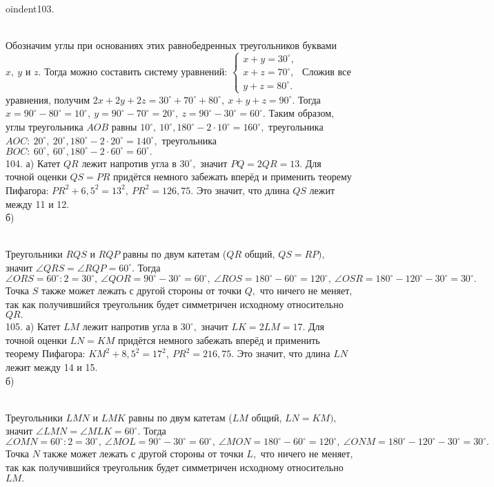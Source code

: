 oindent103.\begin{figure}[ht!]
\end{figure}\\
Обозначим углы при основаниях этих равнобедренных треугольников буквами $x,\ y$ и $z.$ Тогда можно составить систему уравнений: $\begin{cases}x+y=30^\circ,\\
x+z=70^\circ,\\ y+z=80^\circ.\end{cases}$ Сложив все уравнения, получим $2x+2y+2z=30^\circ+70^\circ+80^\circ,\ x+y+z=90^\circ.$ Тогда $x=90^\circ-80^\circ=10^\circ,\ y=90^\circ-70^\circ=20^\circ,\ z=90^\circ-30^\circ=60^\circ.$ Таким образом, углы треугольника $AOB$ равны $10^\circ,\ 10^\circ, 180^\circ-2\cdot10^\circ=160^\circ,$ треугольника $AOC:\ 20^\circ,\ 20^\circ, 180^\circ-2\cdot20^\circ=140^\circ,$ треугольника $BOC:\ 60^\circ,\ 60^\circ, 180^\circ-2\cdot60^\circ=60^\circ.$\\
104. а) Катет $QR$ лежит напротив угла в $30^\circ,$ значит $PQ=2QR=13.$ Для точной оценки $QS=PR$ придётся немного забежать вперёд и применить теорему Пифагора: $PR^2+6,5^2=13^2,\ PR^2=126,75.$ Это значит, что длина $QS$ лежит между 11 и 12.\\
б)\begin{figure}[ht!]
\end{figure}\\
Треугольники $RQS$ и $RQP$ равны по двум катетам ($QR$ общий, $QS=RP),$ значит $\angle QRS=\angle RQP=60^\circ.$ Тогда $\angle ORS=60^\circ:2=30^\circ,\ \angle QOR=90^\circ-30^\circ=60^\circ,\ \angle ROS=180^\circ-60^\circ=120^\circ,\ \angle OSR=180^\circ-120^\circ-30^\circ=30^\circ.$ Точка $S$ также может лежать с другой стороны от точки $Q,$ что ничего не меняет, так как получившийся треугольник будет симметричен исходному относительно $QR.$\\
105. а) Катет $LM$ лежит напротив угла в $30^\circ,$ значит $LK=2LM=17.$ Для точной оценки $LN=KM$ придётся немного забежать вперёд и применить теорему Пифагора: $KM^2+8,5^2=17^2,\ PR^2=216,75.$ Это значит, что длина $LN$ лежит между 14 и 15.\\
б)\begin{figure}[ht!]
\end{figure}\\
Треугольники $LMN$ и $LMK$ равны по двум катетам ($LM$ общий, $LN=KM),$ значит $\angle LMN=\angle MLK=60^\circ.$ Тогда $\angle OMN=60^\circ:2=30^\circ,\ \angle MOL=90^\circ-30^\circ=60^\circ,\ \angle MON=180^\circ-60^\circ=120^\circ,\ \angle ONM=180^\circ-120^\circ-30^\circ=30^\circ.$ Точка $N$ также может лежать с другой стороны от точки $L,$ что ничего не меняет, так как получившийся треугольник будет симметричен исходному относительно $LM.$\\
